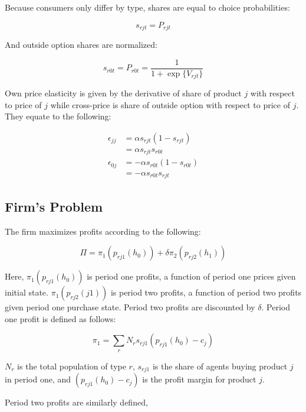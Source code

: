 \documentclass[12pt]{article}
\theoremstyle{definition}
\theoremstyle{remark}
\begin{document}
Because consumers only differ by type, shares are equal to choice probabilities:

\begin{equation}
  s_{rjt} = P_{rjt}
\end{equation}

And outside option shares are normalized:

\begin{equation}
  s_{r0t} = P_{r0t} = \frac{1}{1 + \exp\{V_{rjt}\}}
\end{equation}

Own price elasticity is given by the derivative of share of product $j$ with respect to price of $j$
while cross-price is share of outside option with respect to price of $j$. They
equate to the following:

\begin{align*}
  \epsilon_{jj} &= \alpha s_{rjt}(1-s_{rjt}) \\
  &= \alpha s_{rjt}s_{r0t} \\
  \epsilon_{0j} &= -\alpha s_{r0t}(1-s_{r0t}) \\
  &= -\alpha s_{r0t}s_{rjt}
\end{align*}

\subsection{Firm's Problem}
\label{subsec:firm-problem}

The firm maximizes profits according to the following:

\begin{equation}
  \Pi = \pi_1(p_{rj1}(h_0)) + \delta\pi_2(p_{rj2}(h_1))
\end{equation}

Here, $\pi_1(p_{rj1}(h_0))$ is period one profits, a function of period one prices
given initial state. $\pi_1(p_{rj2}(j1))$ is period two profits, a function of
period two profits given period one purchase state. Period two profits are
discounted by $\delta$. Period one profit is defined as follows:

\begin{equation}
  \pi_1 = \sum_rN_rs_{rj1}(p_{rj1}(h_0) - c_j)
\end{equation}

$N_r$ is the total population of type $r$, $s_{rj1}$ is the share of agents
buying product $j$ in period one, and $(p_{rj1}(h_0) - c_j)$ is the profit
margin for product $j$. 

Period two profits are similarly defined,
\end{document}

